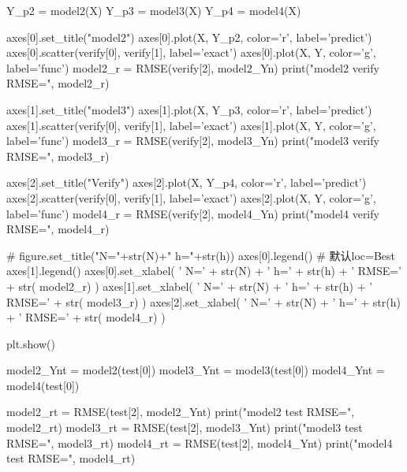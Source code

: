\begin{python}
Y_p2 = model2(X)
Y_p3 = model3(X)
Y_p4 = model4(X)

axes[0].set_title("model2")
axes[0].plot(X, Y_p2, color='r', label='predict')
axes[0].scatter(verify[0], verify[1], label='exact')
axes[0].plot(X, Y, color='g', label='func')
model2_r = RMSE(verify[2], model2_Yn)
print("model2 verify RMSE=", model2_r)

axes[1].set_title("model3")
axes[1].plot(X, Y_p3, color='r', label='predict')
axes[1].scatter(verify[0], verify[1], label='exact')
axes[1].plot(X, Y, color='g', label='func')
model3_r = RMSE(verify[2], model3_Yn)
print("model3 verify RMSE=", model3_r)

axes[2].set_title("Verify")
axes[2].plot(X, Y_p4, color='r', label='predict')
axes[2].scatter(verify[0], verify[1], label='exact')
axes[2].plot(X, Y, color='g', label='func')
model4_r = RMSE(verify[2], model4_Yn)
print("model4 verify RMSE=", model4_r)

# figure.set_title("N="+str(N)+" h="+str(h))
axes[0].legend()  # 默认loc=Best
axes[1].legend()
axes[0].set_xlabel(
    ' N=' + str(N) + ' h=' + str(h) + ' RMSE=' + str(
        model2_r) )
axes[1].set_xlabel(
    ' N=' + str(N) + ' h=' + str(h) + ' RMSE=' + str(
        model3_r) )
axes[2].set_xlabel(
    ' N=' + str(N) + ' h=' + str(h) + ' RMSE=' + str(
        model4_r) )

plt.show()

model2_Ynt = model2(test[0])
model3_Ynt = model3(test[0])
model4_Ynt = model4(test[0])

model2_rt = RMSE(test[2], model2_Ynt)
print("model2 test RMSE=", model2_rt)
model3_rt = RMSE(test[2], model3_Ynt)
print("model3 test RMSE=", model3_rt)
model4_rt = RMSE(test[2], model4_Ynt)
print("model4 test RMSE=", model4_rt)
\end{python}